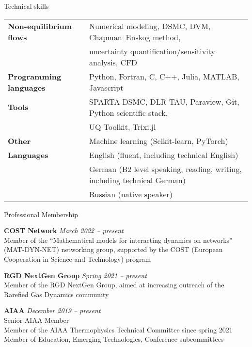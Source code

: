\documentclass{resume} %
\begin{document}
\begin{rSection}{Technical skills}

\begin{tabular}{ @{} >{\bfseries}l @{\hspace{1ex}} l }
Non-equilibrium flows \ & Numerical modeling, DSMC, DVM, Chapman--Enskog method, \\
\ & uncertainty quantification/sensitivity analysis, CFD \\
Programming languages \ & Python, Fortran, C, C++, Julia, MATLAB, Javascript \\
Tools \ & SPARTA DSMC, DLR TAU, Paraview, Git, Python scientific stack, \\
\ & UQ Toolkit, Trixi.jl \\
Other \ & Machine learning (Scikit-learn, PyTorch) \\ 
Languages \ & English (fluent, including technical English) \\
\ & German (B2 level speaking, reading, writing, including technical German) \\
\ & Russian (native speaker)
\end{tabular}

\end{rSection}



\begin{rSection}{Professional Membership}


{\bf COST Network} \hfill {\em March 2022 -- present} \\ 
Member of the ``Mathematical models for interacting dynamics on networks'' (MAT-DYN-NET) networking group, supported by the COST (European Cooperation in Science and Technology) program


{\bf RGD NextGen Group} \hfill {\em Spring 2021 -- present} \\ 
Member of the RGD NextGen Group, aimed at increasing outreach of the Rarefied Gas Dynamics community

{\bf AIAA} \hfill {\em December 2019 -- present} \\ 
Senior AIAA Member \\
Member of the AIAA Thermophysics Technical Committee since spring 2021 \\
Member of Education, Emerging Technologies, Conference subcommittees
\end{rSection}
\newpage
\end{document}
